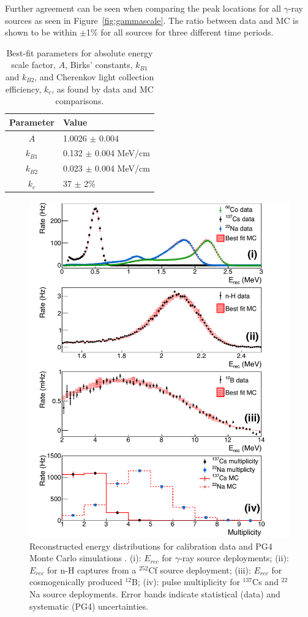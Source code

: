 Further agreement can be seen when comparing the peak locations for all $\gamma$-ray sources as seen in Figure~\ref{fig:gammascale}. The ratio between data and MC is shown to be within $\pm$1\% for all sources for three different time periods.

\begin{table}
	\centering
\begin{tabular}{c|l}
	\hline 
	\textbf{Parameter} & \textbf{Value} \\ 
	\hline 
	$A$ & 1.0026 $\pm$ 0.004 \\ 
	$k_{B1}$ & 0.132 $\pm$ 0.004 MeV/cm \\ 
	$k_{B2}$ & 0.023 $\pm$ 0.004 MeV/cm \\ 
	$k_c$ & 37 $\pm$ 2\% \\ 
	\hline 
\end{tabular} 
\caption{Best-fit parameters for absolute energy scale factor, $A$, Birks' constants, $k_{B1}$ and $k_{B2}$, and Cherenkov light collection efficiency, $k_c$, as found by data and MC comparisons.}
\label{tab:MCValues}
\end{table}


\begin{figure}[h]
	\centering
	\includegraphics[width=0.7\linewidth]{tex/5-analysis-images/GammaE}
	\caption{Reconstructed energy distributions for calibration data and PG4 Monte Carlo simulations \cite{XZhang:2815}. (i): $E_{rec}$ for $\gamma$-ray source deployments; (ii): $E_{rec}$ for n-H captures from a $^{252}$Cf source deployment; (iii): $E_{rec}$ for cosmogenically produced $^{12}$B; (iv): pulse multiplicity for $^{137}$Cs and $^{22}$Na source deployments. Error bands indicate statistical (data) and systematic (PG4) uncertainties.}
	\label{fig:gammae}
\end{figure}

